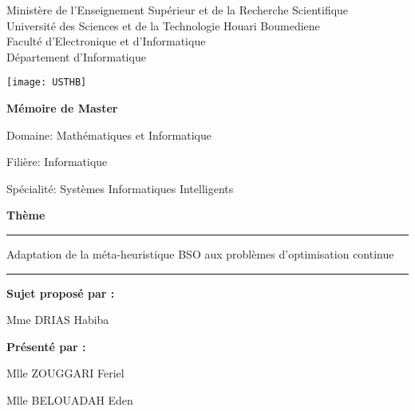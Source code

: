 \begin{titlepage}
\begin{center}
\sffamily
{\small
Ministère de l'Enseignement Supérieur et de la Recherche Scientifique\\
Université des Sciences et de la Technologie Houari Boumediene\\
Faculté d'Electronique et d'Informatique\\
Département d'Informatique\\
}

\vspace{0.75em}

\texttt{[image: USTHB]}

\vspace{0.75em}

{\bfseries\LARGE Mémoire de Master}

\vspace{0.75em}

{\large Domaine: }
{\large Mathématiques et Informatique}

\vspace{0.75em}

{\large Filière: }
{\large Informatique}

\vspace{0.75em}

{\large Spécialité: }
{\large Systèmes Informatiques Intelligents}

\vspace{1.5em}

{\bfseries\LARGE Thème}

\rule{\textwidth}{1pt}

\vspace{1em}

{\fontsize{1cm}{1.5cm}\selectfont Adaptation de la méta-heuristique BSO aux problèmes d'optimisation continue}

\rule{\textwidth}{1pt}

\vspace{3em}

\begin{minipage}[t]{0.3\textwidth}
\textbf{Sujet proposé par :}

Mme DRIAS Habiba
\end{minipage}
\hspace{\fill}
\begin{minipage}[t]{0.3\textwidth}
\textbf{Présenté par :}

Mlle ZOUGGARI Feriel

Mlle BELOUADAH Eden
\end{minipage}


\end{center}
\end{titlepage}
